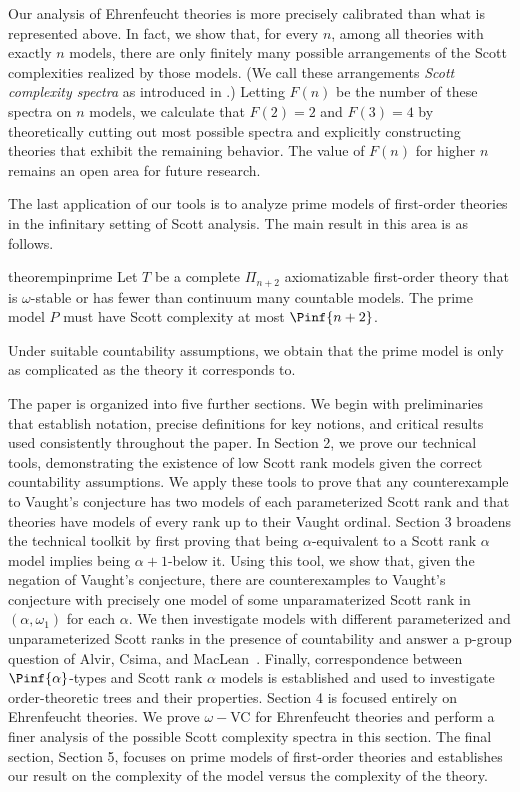 \documentclass[10pt,a4paper]{amsart}
\renewcommand{\-}{\text{-}}
\begin{document}
Our analysis of Ehrenfeucht theories is more precisely calibrated than what is represented above.
In fact, we show that, for every $n$, among all theories with exactly $n$ models, there are only finitely many possible arrangements of the Scott complexities realized by those models. 
(We call these arrangements \emph{Scott complexity spectra} as introduced in \cite{GLRS}.)
Letting $F(n)$ be the number of these spectra on $n$ models, we calculate that $F(2)=2$ and $F(3)=4$ by theoretically cutting out most possible spectra and explicitly constructing theories that exhibit the remaining behavior.
The value of $F(n)$ for higher $n$ remains an open area for future research.

The last application of our tools is to analyze prime models of first-order theories in the infinitary setting of Scott analysis.
The main result in this area is as follows.
\begin{restatable*}{theorem}{pinprime}\label{thm:pinprime}
Let $T$ be a complete $\Pi_{n+2}$ axiomatizable first-order theory that is $\omega$-stable or has fewer than continuum many countable models.
The prime model $P$ must have Scott complexity at most $\Pinf{n+2}$.
\end{restatable*}

Under suitable countability assumptions, we obtain that the prime model is only as complicated as the theory it corresponds to.

The paper is organized into five further sections.
We begin with preliminaries that establish notation, precise definitions for key notions, and critical results used consistently throughout the paper.
In Section 2, we prove our technical tools, demonstrating the existence of low Scott rank models given the correct countability assumptions.
We apply these tools to prove that any counterexample to Vaught's conjecture has two models of each parameterized Scott rank and that theories have models of every rank up to their Vaught ordinal.
Section 3 broadens the technical toolkit by first proving that being $\alpha$-equivalent to a Scott rank $\alpha$ model implies being $\alpha+1$-below it.
Using this tool, we show that, given the negation of Vaught's conjecture, there are counterexamples to Vaught's conjecture with precisely one model of some unparamaterized Scott rank in $(\alpha,\omega_1)$ for each $\alpha$.
We then investigate models with different parameterized and unparameterized Scott ranks in the presence of countability and answer a p-group question of Alvir, Csima, and MacLean~\cite{ACM24}.
Finally, correspondence between $\Pinf{\alpha}$-types and Scott rank $\alpha$ models is established and used to investigate order-theoretic trees and their properties.
Section 4 is focused entirely on Ehrenfeucht theories.
We prove $\omega-$VC for Ehrenfeucht theories and perform a finer analysis of the possible Scott complexity spectra in this section.
The final section, Section 5, focuses on prime models of first-order theories and establishes our result on the complexity of the model versus the complexity of the theory.
\end{document}
